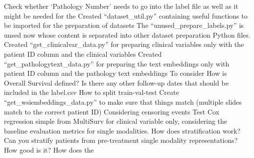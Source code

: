 \documentclass{article}%
\begin{document}
%
Check whether ‘Pathology Number’ needs to go into the label file as well as it might be needed for the %
\newline%
\newline%
%
Created “dataset\_util.py” containing useful functions to be imported for the preparation of datasets %
\newline%
\newline%
%
The “unused\_prepare\_labels.py” is unsed now whose content is separated into other dataset preparation Python files. %
\newline%
\newline%
%
Created “get\_clinicalvar\_data.py” for preparing clinical variables only with the patient ID column and the clinical variables %
\newline%
\newline%
%
Created “get\_pathologytext\_data.py” for preparing the text embeddings only with patient ID column and the pathology text embeddings %
\newline%
\newline%
%
To consider %
\newline%
\newline%
%
How is Overall Survival defined? %
\newline%
\newline%
%
Is there any other follow{-}up dates that should be included in the label.csv %
\newline%
\newline%
%
How to split train{-}val{-}test %
\newline%
\newline%
%
Create “get\_wsiembeddings\_data.py” to make sure that things match (multiple slides match to the correct patient ID) %
\newline%
\newline%
%
Considering censoring events %
\newline%
\newline%
%
Test Cox regression simple from MultiSurv for clinical variable only, considering the baseline evaluation metrics for single modalities.%
\newline%
\newline%
%
How does stratification work? Can you stratify patients from pre{-}treatment single modality representations? How good is it? %
\newline%
\newline%
%
How does the %
\newline%
\newline%
\end{document}
